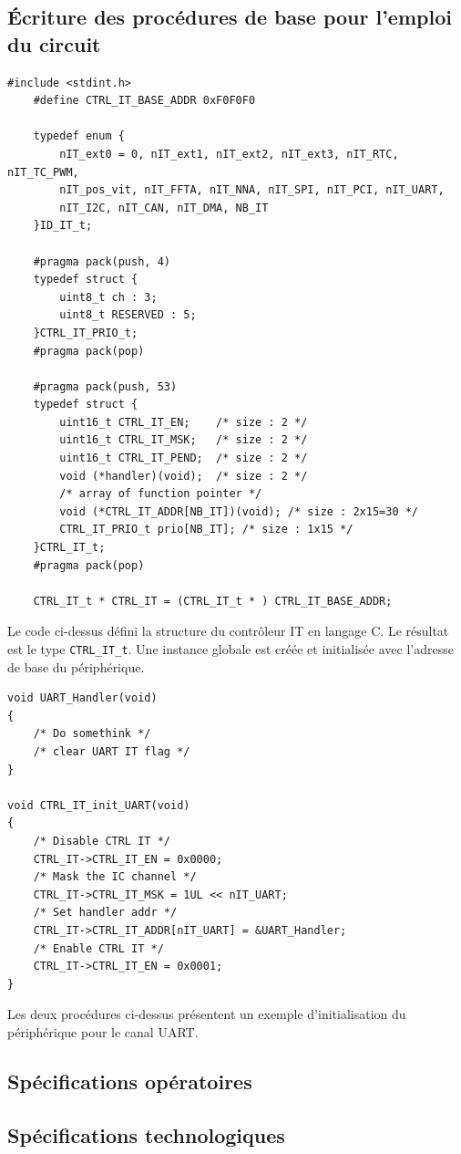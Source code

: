 \subsection{Écriture des procédures de base pour l'emploi du circuit}

\begin{lstlisting}[style=CStyle]
	#include <stdint.h>
	#define CTRL_IT_BASE_ADDR 0xF0F0F0
	
	typedef enum {
		nIT_ext0 = 0, nIT_ext1, nIT_ext2, nIT_ext3, nIT_RTC, nIT_TC_PWM,
		nIT_pos_vit, nIT_FFTA, nIT_NNA,	nIT_SPI, nIT_PCI, nIT_UART,
		nIT_I2C, nIT_CAN, nIT_DMA, NB_IT
	}ID_IT_t;
	
	#pragma pack(push, 4)
	typedef struct {
		uint8_t ch : 3;
		uint8_t RESERVED : 5;
	}CTRL_IT_PRIO_t;
	#pragma pack(pop)

	#pragma pack(push, 53)
	typedef struct {
		uint16_t CTRL_IT_EN;	/* size : 2 */
		uint16_t CTRL_IT_MSK;	/* size : 2 */
		uint16_t CTRL_IT_PEND;	/* size : 2 */
		void (*handler)(void);  /* size : 2 */
		/* array of function pointer */
		void (*CTRL_IT_ADDR[NB_IT])(void); /* size : 2x15=30 */
		CTRL_IT_PRIO_t prio[NB_IT];	/* size : 1x15 */
	}CTRL_IT_t;
	#pragma pack(pop)
	
	CTRL_IT_t * CTRL_IT = (CTRL_IT_t * ) CTRL_IT_BASE_ADDR;
\end{lstlisting}
Le code ci-dessus défini la structure du contrôleur IT en langage C. Le résultat est le type \texttt{CTRL\_IT\_t}. Une instance globale est créée et initialisée avec l'adresse de base du périphérique.

\begin{lstlisting}[style=CStyle]
void UART_Handler(void)
{
    /* Do somethink */
    /* clear UART IT flag */
}

void CTRL_IT_init_UART(void)
{
    /* Disable CTRL IT */
    CTRL_IT->CTRL_IT_EN = 0x0000;
    /* Mask the IC channel */
    CTRL_IT->CTRL_IT_MSK = 1UL << nIT_UART;
    /* Set handler addr */
    CTRL_IT->CTRL_IT_ADDR[nIT_UART] = &UART_Handler;
    /* Enable CTRL IT */
    CTRL_IT->CTRL_IT_EN = 0x0001;
}
\end{lstlisting}
Les deux procédures ci-dessus présentent un exemple d'initialisation du périphérique pour le canal UART.

\subsection{Spécifications opératoires}
\subsection{Spécifications technologiques}